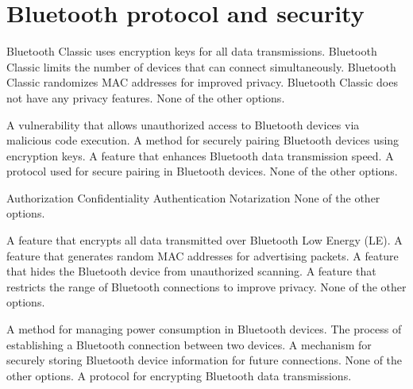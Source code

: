 \section{Bluetooth protocol and security}

\begin{checkboxes}
    \choice Bluetooth Classic uses encryption keys for all data transmissions.
    \choice Bluetooth Classic limits the number of devices that can connect simultaneously.
    \choice Bluetooth Classic randomizes MAC addresses for improved privacy.
    \CorrectChoice Bluetooth Classic does not have any privacy features.
    \choice None of the other options.
\end{checkboxes}

\begin{checkboxes}
    \choice A vulnerability that allows unauthorized access to Bluetooth devices via malicious code execution.
    \choice A method for securely pairing Bluetooth devices using encryption keys.
    \choice A feature that enhances Bluetooth data transmission speed.
    \choice A protocol used for secure pairing in Bluetooth devices.
    \CorrectChoice None of the other options.
\end{checkboxes}

\begin{checkboxes}
    \CorrectChoice Authorization
    \CorrectChoice Confidentiality
    \CorrectChoice Authentication
    \choice Notarization
    \choice None of the other options.
\end{checkboxes}



\begin{checkboxes}
    \choice A feature that encrypts all data transmitted over Bluetooth Low Energy (LE).
    \CorrectChoice A feature that generates random MAC addresses for advertising packets.
    \choice A feature that hides the Bluetooth device from unauthorized scanning.
    \choice A feature that restricts the range of Bluetooth connections to improve privacy.
    \choice None of the other options.
\end{checkboxes}


\begin{checkboxes}
    \choice A method for managing power consumption in Bluetooth devices.
    \CorrectChoice The process of establishing a Bluetooth connection between two devices.
    \choice A mechanism for securely storing Bluetooth device information for future connections.
    \choice None of the other options.
    \choice A protocol for encrypting Bluetooth data transmissions.
\end{checkboxes}


